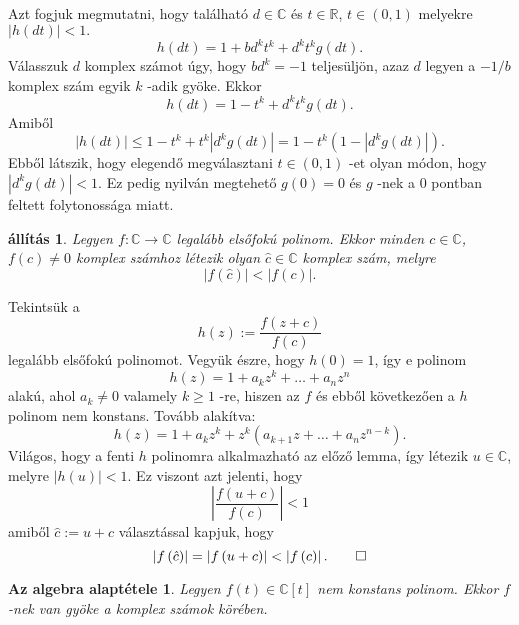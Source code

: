 \documentclass[a4paper, showtrims]{memoir}
\makeatletter
\renewenvironment{proof}[1][\proofname]
    {\par\pushQED{\qed}%
    \normalfont \topsep6\p@\@plus6\p@\relax
    \trivlist
    \item[\hskip\labelsep
        \itshape
    #1\@addpunct{:}]\ignorespaces}
    {\popQED\endtrivlist\@endpefalse}
\theoremstyle{plain}
\newtheorem{proposition}{állítás}[chapter]
\newtheorem*{FA}{Az algebra alaptétele}
\theoremstyle{remark}
\theoremstyle{definition}
\makeatother
\begin{document}
\begin{proof}
	Azt fogjuk megmutatni, hogy található $d\in \mathbb{C}$ és $t\in
		\mathbb{R}$, $t\in \left( 0,1\right) $ melyekre $\left| h\left( dt\right)
		\right| <1.$\[
		h\left( dt\right) =1+bd^{k}t^{k}+d^{k}t^{k}g\left( dt\right) .
	\]
	Válasszuk $d$ komplex számot úgy, hogy $bd^{k}=-1$ teljesüljön, azaz $d$ legyen a $-1/b$ komplex szám egyik $k$ -adik gyöke.
	Ekkor
	\[
		h\left( dt\right) =1-t^{k}+d^{k}t^{k}g\left( dt\right) .
	\]
	Amiből
	\[
		\left| h\left( dt\right) \right| \leq 1-t^{k}+t^{k}\left| d^{k}g\left(
		dt\right) \right| =1-t^{k}\left( 1-\left| d^{k}g\left( dt\right) \right|
		\right) .
	\]
	Ebből látszik, hogy elegendő megválasztani $t\in \left(
		0,1\right) $ -et olyan módon, hogy $\left| d^{k}g\left( dt\right)
		\right| <1.$ Ez pedig nyilván megtehető $g\left( 0\right) =0$ és
	$g$ -nek a $0$ pontban feltett folytonossága miatt.
\end{proof}

\begin{proposition}
	\label{Th:Cauchy2}Legyen $f:\mathbb{C}\rightarrow \mathbb{C}$ legalább elsőfokú polinom.
	Ekkor minden $c\in \mathbb{C}$, $f\left( c\right) \neq 0$
	komplex számhoz létezik olyan $\hat{c}\in \mathbb{C}$ komplex szám,
	melyre
	\[
		\left| f\left( \hat{c}\right) \right| <\left| f\left( c\right) \right| .
	\]
\end{proposition}

\begin{proof}
	Tekintsük a
	\[
		h\left( z\right) :=\frac{f\left( z+c\right) }{f\left( c\right) }
	\]
	legalább elsőfokú polinomot.
	Vegyük észre, hogy $h\left(
		0\right) =1$, így e polinom
	\[
		h\left( z\right) =1+a_{k}z^{k}+\ldots +a_{n}z^{n}
	\]
	alakú, ahol $a_{k}\neq 0$ valamely $k\geq 1$ -re, hiszen az $f$ és
	ebből következően a $h$ polinom nem konstans.
	Tovább alakítva:
	\[
		h\left( z\right) =1+a_{k}z^{k}+z^{k}\left( a_{k+1}z+\ldots
		+a_{n}z^{n-k}\right) .
	\]
	Világos, hogy a fenti $h$ polinomra alkalmazható az előző
	lemma, így létezik $u\in \mathbb{C}$, melyre $\left| h\left( u\right)
		\right| <1.$ Ez viszont azt jelenti, hogy
	\[
		\left| \frac{f\left( u+c\right) }{f\left( c\right) }\right| <1
	\]
	amiből $\hat{c}:=u+c$ választással kapjuk, hogy
	\[
		\left| f\left( \hat{c}\right) \right| =\left| f\left( u+c\right) \right|
		<\left| f\left( c\right) \right| .\qedhere
	\]
\end{proof}

\begin{FA}\label{Th:FundOfAlg}
	Legyen $f\left( t \right)\in\mathbb{C}[t]$ nem konstans polinom.
	Ekkor $f$-nek van gyöke a komplex számok körében.
\end{FA}
\end{document}
